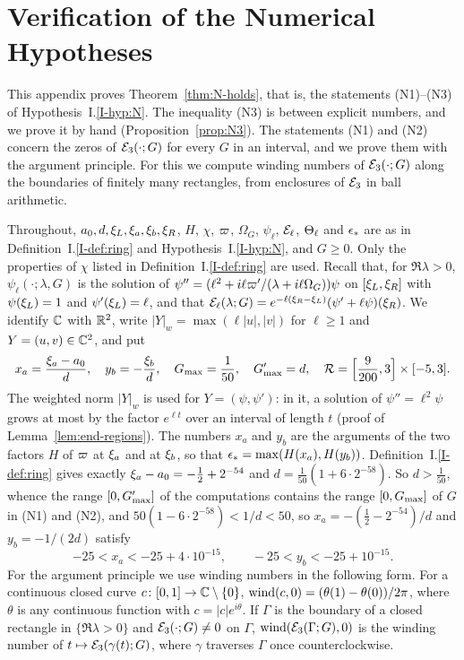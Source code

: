 \section{Verification of the Numerical Hypotheses}
\label{app:verify}

This appendix proves Theorem~\ref{thm:N-holds}, that is, the statements
\textup{(N1)}--\textup{(N3)} of Hypothesis~I.\ref{I-hyp:N}. The inequality
\textup{(N3)} is between explicit numbers, and we prove it by hand
(Proposition~\ref{prop:N3}). The statements \textup{(N1)} and \textup{(N2)} concern
the zeros of $\mathcal{E}_3(\cdot;G)$ for every $G$ in an interval, and we prove them with
the argument principle. For this we compute winding numbers of $\mathcal{E}_3(\cdot;G)$
along the boundaries of finitely many rectangles, from enclosures of $\mathcal{E}_3$ in
ball arithmetic.

Throughout, $a_0,d,\xi_L,\xi_a,\xi_b,\xi_R$, $H$, $\chi$, $\varpi$, $\Omega_G$,
$\psi_\ell$, $\mathcal{E}_\ell$, $\Theta_{\ell}$ and $\epsilon_*$ are as in
Definition~I.\ref{I-def:ring} and Hypothesis~I.\ref{I-hyp:N}, and $G\ge0$. Only the
properties of $\chi$ listed in Definition~I.\ref{I-def:ring} are used. Recall that, for
$\Re\lambda>0$, $\psi_\ell(\cdot;\lambda,G)$ is the solution of
$\psi''=(\ell^2+i\ell\varpi'/(\lambda+i\ell\Omega_G))\psi$ on $[\xi_L,\xi_R]$ with
$\psi(\xi_L)=1$ and $\psi'(\xi_L)=\ell$, and that
$\mathcal{E}_\ell(\lambda;G)=e^{-\ell(\xi_R-\xi_L)}(\psi'+\ell\psi)(\xi_R)$.
We identify $\mathbb{C}$ with $\mathbb{R}^2$, write $|Y|_w=\max(\ell|u|,|v|)$ for
$\ell\ge1$ and $Y=(u,v)\in\mathbb{C}^2$, and put
\[
x_a=\frac{\xi_a-a_0}{d},\quad y_b=-\frac{\xi_b}{d},\quad G_{\max}=\frac1{50},\quad G_{\max}'=d,\quad
\mathcal{R}=\Big[\frac9{200},3\Big]\times[-5,3].
\]
The weighted norm $|Y|_w$ is used for $Y=(\psi,\psi')$: in it, a solution of
$\psi''=\ell^2\psi$ grows at most by the factor $e^{\ell t}$ over an interval of
length $t$ (proof of Lemma~\ref{lem:end-regions}). The numbers $x_a$ and $y_b$ are
the arguments of the two factors $H$ of $\varpi$ at $\xi_a$ and at $\xi_b$, so that
$\epsilon_*=\max(H(x_a),H(y_b))$.
Definition~I.\ref{I-def:ring} gives exactly $\xi_a-a_0=-\frac12+2^{-54}$ and
$d=\frac1{50}(1+6\cdot2^{-58})$. So $d>\frac1{50}$, whence the range
$[0,G_{\max}']$ of the computations contains the range $[0,G_{\max}]$ of $G$ in
\textup{(N1)} and \textup{(N2)}, and $50(1-6\cdot2^{-58})<1/d<50$, so
$x_a=-(\frac12-2^{-54})/d$ and $y_b=-1/(2d)$ satisfy
\begin{equation}
\label{eq:xayb}
-25<x_a<-25+4\cdot10^{-15},\qquad -25<y_b<-25+10^{-15}.
\end{equation}
For the argument principle we use winding numbers in the following form.
For a continuous closed curve $c\colon[0,1]\to\mathbb{C}\setminus\{0\}$,
$\operatorname{wind}(c,0)=(\theta(1)-\theta(0))/2\pi$, where $\theta$ is any continuous
function with $c=|c|e^{i\theta}$. If $\Gamma$ is the boundary of a closed
rectangle in $\{\Re\lambda>0\}$ and $\mathcal{E}_3(\cdot;G)\ne0$ on $\Gamma$,
$\operatorname{wind}(\mathcal{E}_3(\Gamma;G),0)$ is the winding number of
$t\mapsto\mathcal{E}_3(\gamma(t);G)$, where $\gamma$ traverses $\Gamma$ once
counterclockwise.

